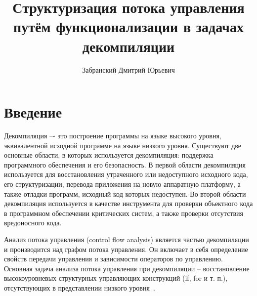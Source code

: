 

\lstset{
language=llang
}

\title{Структуризация потока управления путём функционализации в задачах декомпиляции}
%
\author{Забранский Дмитрий Юрьевич}
%
%
%

\maketitle              %

\begin{abstract}

\end{abstract}
%



\section*{Введение}

Декомпиляция –- это построение программы на языке высокого уровня, эквивалентной исходной программе на языке низкого уровня. Существуют две основные области, в которых используется декомпиляция: поддержка программного обеспечения и его безопасность. В первой области декомпиляция используется для восстановления утраченного или недоступного исходного кода, его структуризации, перевода приложения на новую аппаратную платформу, а также отладки программ, исходный код которых недоступен. Во второй области декомпиляция используется в качестве инструмента для проверки объектного кода в программном обеспечении критических систем, а также проверки отсутствия вредоносного кода.

Анализ потока управления (control flow analysis) является частью декомпиляции и производится над графом потока управления. Он включает в себя определение свойств передачи управления и зависимости операторов по управлению. Основная задача анализа потока управления при декомпиляции – восстановление высокоуровневых структурных управляющих конструкций (if, for и т. п.), отсутствующих в представлении низкого уровня~\cite{reengineering}. 

